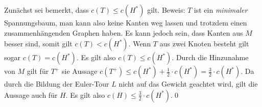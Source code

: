 \documentclass[a4paper]{article}
\begin{document}
	\maketitle
	\section{}
		Zunächst sei bemerkt, dass $c(T)\leq c(H^*)$ gilt.\n
		Beweis: $T$ ist ein \textit{minimaler} Spannungsbaum, man kann also keine Kanten weg lassen und trotzdem einen zusammenhängenden Graphen haben. Es kann jedoch sein, dass Kanten aus $M$ besser sind, somit gilt $c(T)<c(H^*)$. Wenn $T$ aus zwei Knoten besteht gilt sogar $c(T)=c(H^*)$. Es gilt also $c(T)\leq c(H^*)$.\n
		Durch die Hinzunahme von $M$ gilt für $T^+$ sie Aussage $c(T^+)\leq c(H^*)+\frac{1}{2}\cdot c(H^*)=\frac{3}{2}\cdot c(H^*)$.
		Da durch die Bildung der Euler-Tour $L$ nicht auf das Gewicht geachtet wird, gilt die Aussage auch für $H$.\n
		Es gilt also $c(H)\leq \frac{3}{2}\cdot c(H^*)$.\qed
	\section{}
\end{document}
